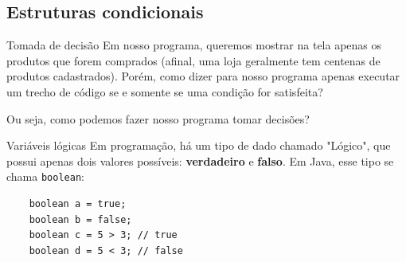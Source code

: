 \documentclass{beamer}
\begin{document}
\subsection{Estruturas condicionais}

\begin{frame}{Tomada de decisão}
    Em nosso programa, queremos mostrar na tela apenas os produtos que forem
    comprados (afinal, uma loja geralmente tem centenas de produtos
    cadastrados). Porém, como dizer para nosso programa apenas executar um
    trecho de código se e somente se uma condição for satisfeita?

    Ou seja, como podemos fazer nosso programa tomar decisões?
\end{frame}

\begin{frame}[fragile]{Variáveis lógicas}
    Em programação, há um tipo de dado chamado "Lógico", que possui apenas dois
    valores possíveis: \textbf{verdadeiro} e \textbf{falso}. Em Java, esse tipo
    se chama \texttt{boolean}:

    \begin{verbatim}
    boolean a = true;
    boolean b = false;
    boolean c = 5 > 3; // true
    boolean d = 5 < 3; // false
    \end{verbatim}
\end{frame}
\end{document}
